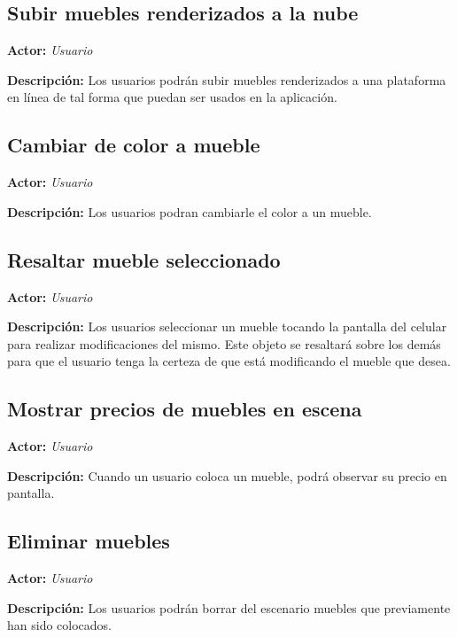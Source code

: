 \subsection{Subir muebles renderizados a la nube}
\textbf{Actor:} \textit{Usuario} \par
\textbf{Descripción:}  Los usuarios podrán subir muebles renderizados a una plataforma en línea de tal forma que puedan ser usados en la aplicación.

\subsection{Cambiar de color a mueble}
\textbf{Actor:} \textit{Usuario} \par
\textbf{Descripción:} Los usuarios podran cambiarle el color a un mueble.

\subsection{Resaltar mueble seleccionado}
\textbf{Actor:} \textit{Usuario} \par
\textbf{Descripción:} Los usuarios seleccionar un mueble tocando la pantalla del celular para realizar modificaciones del mismo. Este objeto se resaltará sobre los demás para que el usuario tenga la certeza de que está modificando el mueble que desea.

\subsection{Mostrar precios de muebles en escena}
\textbf{Actor:} \textit{Usuario} \par
\textbf{Descripción:} Cuando un usuario coloca un mueble, podrá observar su precio en pantalla.

\subsection{Eliminar muebles}
\textbf{Actor:} \textit{Usuario} \par
\textbf{Descripción:} Los usuarios podrán borrar del escenario muebles que previamente han sido colocados. 
